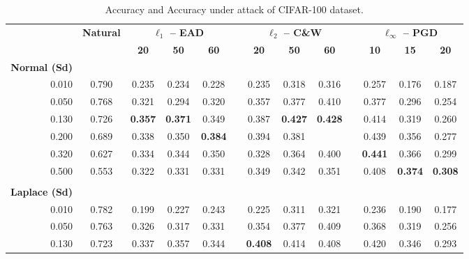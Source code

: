 \begin{table}[htbp]
  \centering
  \tiny
  \caption{Accuracy and Accuracy under attack of CIFAR-100 dataset.}
  \label{table:ap3-cifar100-appendix}%
    \begin{tabular}{rcccccccccccc}
    \toprule
          & \multirow{2}[3]{*}{\textbf{Natural}} & \multicolumn{3}{c}{\textbf{$\ell_1$ -- EAD}} &       & \multicolumn{3}{c}{\textbf{$\ell_2$ -- C\&W}} &       & \multicolumn{3}{c}{\textbf{$\ell_\infty$ -- PGD}} \\
\cmidrule{3-5}\cmidrule{7-9}\cmidrule{11-13}          &       & \textbf{20} & \textbf{50} & \textbf{60} &       & \textbf{20} & \textbf{50} & \textbf{60} &       & \textbf{10} & \textbf{15} & \textbf{20} \\
    \textbf{Normal (Sd)} &       &       &       &       &       &       &       &       &       &       &       &  \\
    0.010 & 0.790 & 0.235 & 0.234 & 0.228 &       & 0.235 & 0.318 & 0.316 &       & 0.257 & 0.176 & 0.187 \\
    0.050 & 0.768 & 0.321 & 0.294 & 0.320 &       & 0.357 & 0.377 & 0.410 &       & 0.377 & 0.296 & 0.254 \\
    0.130 & 0.726 & \textbf{0.357} & \textbf{0.371} & 0.349 &       & 0.387 & \textbf{0.427} & \textbf{0.428} &       & 0.414 & 0.319 & 0.260 \\
    0.200 & 0.689 & 0.338 & 0.350 & \textbf{0.384} &       & 0.394 & 0.381 &       &       & 0.439 & 0.356 & 0.277 \\
    0.320 & 0.627 & 0.334 & 0.344 & 0.350 &       & 0.328 & 0.364 & 0.400 &       & \textbf{0.441} & 0.366 & 0.299 \\
    0.500 & 0.553 & 0.322 & 0.331 & 0.331 &       & 0.349 & 0.342 & 0.351 &       & 0.408 & \textbf{0.374} & \textbf{0.308} \\
          &       &       &       &       &       &       &       &       &       &       &       &  \\
    \textbf{Laplace (Sd)} &       &       &       &       &       &       &       &       &       &       &       &  \\
    \midrule
    0.010 & 0.782 & 0.199 & 0.227 & 0.243 &       & 0.225 & 0.311 & 0.321 &       & 0.236 & 0.190 & 0.177 \\
    0.050 & 0.763 & 0.326 & 0.317 & 0.331 &       & 0.354 & 0.377 & 0.409 &       & 0.368 & 0.319 & 0.256 \\
    0.130 & 0.723 & 0.337 & 0.357 & 0.344 &       & \textbf{0.408} & 0.414 & 0.408 &       & 0.420 & 0.346 & 0.293 \\

\end{tabular}
\end{table}
